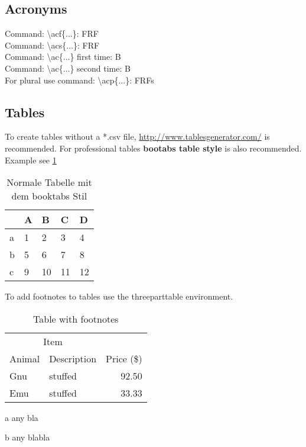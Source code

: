 \subsection{Acronyms}
\label{Acro}
%
\noindent
Command: \textbackslash acf\{...\}: \acf{FRF}\\
Command: \textbackslash acs\{...\}: \acs{FRF}\\
Command: \textbackslash ac\{...\} first time: \ac{B}\\
Command: \textbackslash ac\{...\} second time: \ac{B}\\
For plural  use command: \textbackslash acp\{...\}: \acp{FRF}
%
%
\subsection{Tables}
To create tables without a *.csv file, \url{http://www.tablesgenerator.com/} is recommended.
For professional tables \textbf{bootabs table style} is also recommended.
Example see \ref{SampleTable}
%
\begin{table}[htb]
	\centering
	\caption{Normale Tabelle mit dem booktabs Stil}
	\label{SampleTable}
	\begin{tabular}{@{}lllll@{}}
		\toprule
		& A & B  & C  & D  \\ \midrule
		a & 1 & 2  & 3  & 4  \\
		b & 5 & 6  & 7  & 8  \\
		c & 9 & 10 & 11 & 12 \\ \bottomrule
	\end{tabular}
\end{table}
%
 To add footnotes to tables use the threeparttable environment.
 \begin{table}[htb]
 	\centering
 	\begin{threeparttable}
 		\caption[Table with footnotes]{Table with footnotes}
 		\label{tab:anytab}
 		\begin{tabular}{@{}llr@{}} \toprule
 			\multicolumn{2}{c}{Item} \\ \cmidrule(r){1-2}
 			Animal 		& Description 	& Price (\$)\\ \midrule
 			Gnu\tnote{a}& stuffed   	& 92.50 \\
 			Emu\tnote{b}& stuffed   	& 33.33 \\\bottomrule
 		\end{tabular}
 		\begin{tablenotes}
 			\item[a]	\footnotesize	any bla
 			\item[b]	\footnotesize	any blabla
 		\end{tablenotes}
 	\end{threeparttable}
 \end{table}
